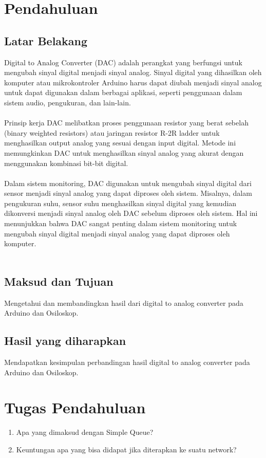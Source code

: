 \section{Pendahuluan}
\subsection{Latar Belakang}
Digital to Analog Converter (DAC) adalah perangkat yang berfungsi untuk mengubah sinyal digital menjadi sinyal analog. 
Sinyal digital yang dihasilkan oleh komputer atau mikrokontroler Arduino harus dapat diubah menjadi sinyal analog untuk dapat digunakan dalam berbagai aplikasi, seperti penggunaan dalam sistem audio, pengukuran, dan lain-lain.
\\\\
Prinsip kerja DAC melibatkan proses penggunaan resistor yang berat sebelah (binary weighted resistors) atau jaringan resistor R-2R ladder untuk menghasilkan output analog yang sesuai dengan input digital. 
Metode ini memungkinkan DAC untuk menghasilkan sinyal analog yang akurat dengan menggunakan kombinasi bit-bit digital.
\\\\
Dalam sistem monitoring, DAC digunakan untuk mengubah sinyal digital dari sensor menjadi sinyal analog yang dapat diproses oleh sistem. 
Misalnya, dalam pengukuran suhu, sensor suhu menghasilkan sinyal digital yang kemudian dikonversi menjadi sinyal analog oleh DAC sebelum diproses oleh sistem. 
Hal ini menunjukkan bahwa DAC sangat penting dalam sistem monitoring untuk mengubah sinyal digital menjadi sinyal analog yang dapat diproses oleh komputer.
\\\\

\subsection{Maksud dan Tujuan}
Mengetahui dan membandingkan hasil dari digital to analog converter pada Arduino dan Osiloskop.

\subsection{Hasil yang diharapkan}
Mendapatkan kesimpulan perbandingan hasil digital to analog converter pada Arduino dan Osiloskop.
\section{Tugas Pendahuluan}
\begin{center}
	\colorbox{cyan!30}{\parbox{0.8\linewidth}{
    \begin{enumerate}
        \item Apa yang dimaksud dengan Simple Queue?
        \item Keuntungan apa yang bisa didapat jika diterapkan ke suatu network?
    \end{enumerate}}}
\end{center}

